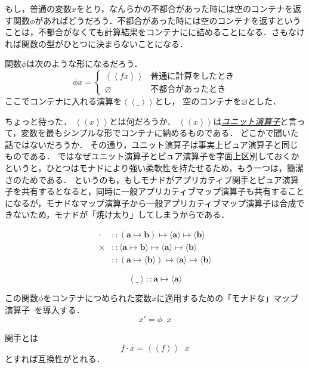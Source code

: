 \documentclass[a5paper,draft]{jsbook}
\newcommand{\keyword}[1]{{\underline{\emph{#1}}}}
\newcommand{\mathTypeParameter}[1]{\mathbf{#1}}
\newcommand{\mathPureWith}[1]{\left\langle#1\right\rangle}
\newcommand{\mathUnitWith}[1]{\left\langle\!\left\langle#1\right\rangle\!\right\rangle}
\newcommand{\mathPureNothing}{\varnothing}
\newcommand{\mathAny}{\_}
\newcommand{\mathApplicativeGeneralMap}{\mathbin{\times}}
\newcommand{\mathGeneralMap}{\mathbin{\cdot}}
\newcommand{\mathIn}{\mathrel{::}}
\newcommand{\mathMapsTo}{\mapsto}
\newcommand{\mathMorph}[2]{#1\mathMapsTo#2}
\newcommand{\mathMorphII}[3]{#1\mathMapsTo#2\mathMapsTo#3}
\DeclareMathOperator{\hsklMonadMap}{{DO NOT USE}--\heartsuit}
\begin{document}
もし，普通の変数$x$をとり，なんらかの不都合があった時には空のコンテナを返す関数$\phi$があればどうだろう．不都合があった時には空のコンテナを返すということは，不都合がなくても計算結果をコンテナにに詰めることになる．さもなければ関数の型がひとつに決まらないことになる．

関数$\phi$は次のような形になるだろう．
$$\phi x=\begin{cases}\mathUnitWith{fx}&\text{普通に計算をしたとき}\\
\mathPureNothing&\text{不都合があったとき}\end{cases}$$
ここでコンテナに入れる演算を$\mathUnitWith{\mathAny}$とし，
空のコンテナを$\mathPureNothing$とした．

ちょっと待った．
$\mathUnitWith{x}$とは何だろうか．
$\mathUnitWith{x}$は\keyword{ユニット演算子}と言って，変数を最もシンプルな形でコンテナに納めるものである．
どこかで聞いた話ではないだろうか．
その通り，ユニット演算子は事実上ピュア演算子と同じものである．
ではなぜユニット演算子とピュア演算子を字面上区別しておくかというと，ひとつはモナドにより強い柔軟性を持たせるため，もう一つは，簡潔さのためである．
というのも，もしモナドがアプリカティブ関手とピュア演算子を共有するとなると，同時に一般アプリカティブマップ演算子も共有することになるが，モナドなマップ演算子から一般アプリカティブマップ演算子は合成できないため，モナドが「焼け太り」してしまうからである．

\begin{align*}
\mathGeneralMap&\mathIn{}\mathMorphII{(\mathMorph{\mathTypeParameter{a}}{\mathTypeParameter{b}})}{\langle\mathTypeParameter{a}\rangle}{\langle\mathTypeParameter{b}
\rangle}\\
\mathApplicativeGeneralMap&\mathIn{}\mathMorphII{\langle\mathMorph{\mathTypeParameter{a}}{\mathTypeParameter{b}}\rangle}{\langle\mathTypeParameter{a}\rangle}{\langle\mathTypeParameter{b}\rangle}\\
\hsklMonadMap&\mathIn{}\mathMorphII{(\mathMorph{\mathTypeParameter{a}}{\langle\mathTypeParameter{b}\rangle})}{\langle\mathTypeParameter{a}\rangle}{\langle{\mathTypeParameter{b}}\rangle}
\end{align*}

$$\mathPureWith{\mathAny}\mathIn\mathMorph{\mathTypeParameter{a}}{\langle\mathTypeParameter{a}\rangle}$$

この関数$\phi$をコンテナにつめられた変数$x$に適用するための「モナドな」マップ演算子$\hsklMonadMap$を導入する．
$$x'=\phi\hsklMonadMap x$$

関手とは
$$f\mathGeneralMap x=\mathUnitWith{f}\hsklMonadMap x$$
とすれば互換性がとれる．
\end{document}
